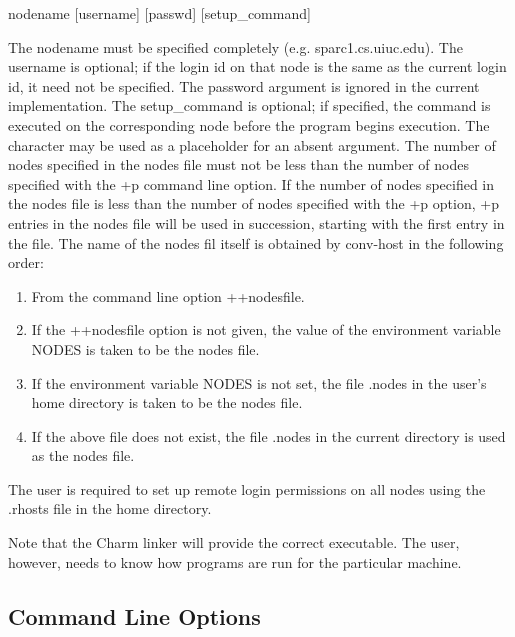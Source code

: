 \begin{itemize}
{\fexec nodename [username] [passwd] [setup\_command]}

The {\fparm nodename} must be specified completely (e.g. sparc1.cs.uiuc.edu).
The {\fparm username} is optional; if the login id on that node is the
same as the current login id, it need not be specified.
The {\fparm password} argument is ignored in the current implementation.
The {\fparm setup\_command} is optional; if specified,
the command is executed on the corresponding node before the program 
begins execution. The {\bf *} character may be used as a
placeholder for an absent argument.
The number of nodes specified in the nodes file must not be less
than the number of nodes specified with the {\fexec +p} command
line option. If the number of nodes specified in the nodes file is
less than the number of nodes specified with the {\fexec +p} option,
{\fexec +p} entries in the nodes file will be used in succession, starting
with the first entry in the file.
The name of the nodes fil itself is
obtained by  {\fexec conv-host} in the following order:
\begin{enumerate}
\item	From the command line option {\fexec ++nodesfile}.
\item	If the {\fexec ++nodesfile} option is not given, the value of the 
environment variable {\fexec NODES} is taken to be the nodes file.
\item	If the environment variable {\fexec NODES} is not set, the file 
{\fparm .nodes} in the user's home directory is taken 
to be the nodes file.
\item	If the above file does not exist, the file 
{\fparm .nodes} in the current
directory is used as  the nodes file.
\end{enumerate}
The user is required to set up remote login permissions on all nodes
using the .rhosts file in the home directory.

\end{itemize}

Note that the Charm linker will provide the correct 
executable. The user, however, needs to know how programs are run for
the particular machine.



\subsection[Command Line Options]{Command Line Options}
\label{command line options}

